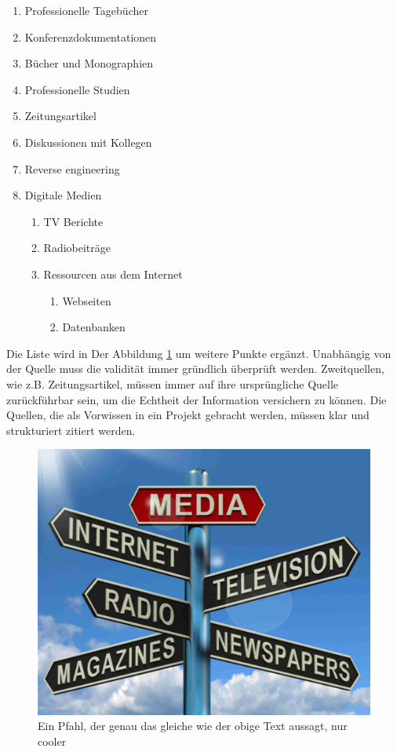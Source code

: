         \begin{enumerate}
            \item Professionelle Tagebücher
            \item Konferenzdokumentationen
            \item Bücher und Monographien
            \item Professionelle Studien 
            \item Zeitungsartikel
            \item Diskussionen mit Kollegen
            \item Reverse engineering
            \item Digitale Medien
                \begin{enumerate}
                    \item TV Berichte
                    \item Radiobeiträge
                    \item Ressourcen aus dem Internet
                        \begin{enumerate}
                            \item Webseiten
                            \item Datenbanken
                        \end{enumerate}
                \end{enumerate}
        \end{enumerate}
        

    Die Liste wird in Der Abbildung \ref{fig:medien} um weitere Punkte ergänzt.
    Unabhängig von der Quelle muss die validität immer gründlich überprüft werden. 
    Zweitquellen, wie z.B. Zeitungsartikel, müssen immer auf ihre ursprüngliche Quelle 
    zurückführbar sein, um die Echtheit der Information versichern zu können. Die Quellen, die 
    als Vorwissen in ein Projekt gebracht werden, müssen klar und strukturiert zitiert werden.

    \begin{figure}[H]
        \centering
        \includegraphics[width=0.5\linewidth]{graphics/media.jpg}
        \caption[Arten von Medien]{Ein Pfahl, der genau das gleiche wie der obige Text aussagt, nur cooler}

        
        \label{fig:medien}
    \end{figure}

